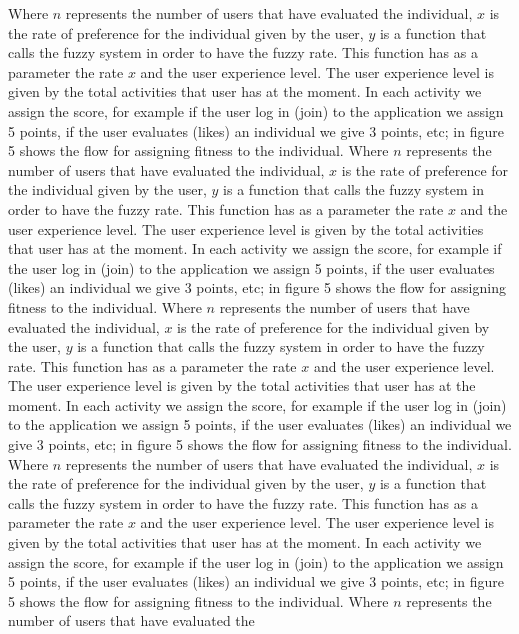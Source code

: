 Where $n$ represents  the number of  users that have evaluated the
individual, $x$ is the rate of preference for the  individual  given by the user,
$y$ is a function that calls the fuzzy system in order to have the fuzzy rate.
This function has as a parameter the rate $x$ and the user experience level.
The user experience level
is given  by the  total activities that user has at the moment. In each
activity we assign the score, for example if the user log in (join) to the
application we assign 5 points, if the user evaluates (likes) an individual we
give 3 points, etc; in figure 5 shows the flow for assigning fitness to
the individual. Where $n$ represents  the number of  users that have evaluated the
individual, $x$ is the rate of preference for the  individual  given by the user,
$y$ is a function that calls the fuzzy system in order to have the fuzzy rate.
This function has as a parameter the rate $x$ and the user experience level.
The user experience level
is given  by the  total activities that user has at the moment. In each
activity we assign the score, for example if the user log in (join) to the
application we assign 5 points, if the user evaluates (likes) an individual we
give 3 points, etc; in figure 5 shows the flow for assigning fitness to
the individual. Where $n$ represents  the number of  users that have evaluated the
individual, $x$ is the rate of preference for the  individual  given by the user,
$y$ is a function that calls the fuzzy system in order to have the fuzzy rate.
This function has as a parameter the rate $x$ and the user experience level.
The user experience level
is given  by the  total activities that user has at the moment. In each
activity we assign the score, for example if the user log in (join) to the
application we assign 5 points, if the user evaluates (likes) an individual we
give 3 points, etc; in figure 5 shows the flow for assigning fitness to
the individual. Where $n$ represents  the number of  users that have evaluated the
individual, $x$ is the rate of preference for the  individual  given by the user,
$y$ is a function that calls the fuzzy system in order to have the fuzzy rate.
This function has as a parameter the rate $x$ and the user experience level.
The user experience level
is given  by the  total activities that user has at the moment. In each
activity we assign the score, for example if the user log in (join) to the
application we assign 5 points, if the user evaluates (likes) an individual we
give 3 points, etc; in figure 5 shows the flow for assigning fitness to
the individual. Where $n$ represents  the number of  users that have evaluated the
